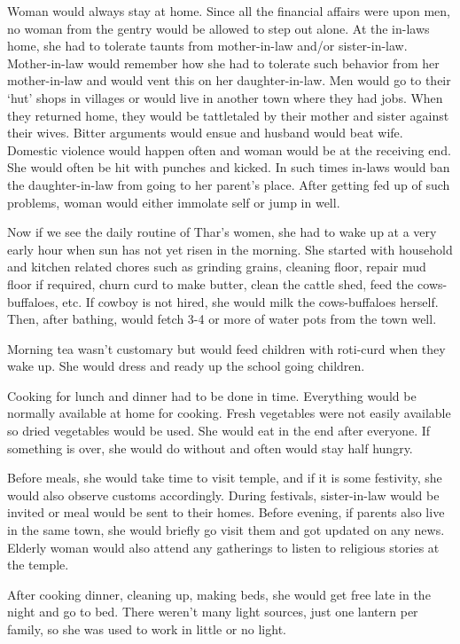 Woman would always stay at home. Since all the financial affairs were upon men,
no woman from the gentry would be allowed to step out alone. At the in-laws
home, she had to tolerate taunts from mother-in-law and/or sister-in-law.
Mother-in-law would remember how she had to tolerate such behavior from her
mother-in-law and would vent this on her daughter-in-law. Men would go to their
`hut' shops in villages or would live in another town where they had jobs. When
they returned home, they would be tattletaled by their mother and sister
against their wives. Bitter arguments would ensue and husband would beat wife.
Domestic violence would happen often and woman would be at the receiving end.
She would often be hit with punches and kicked. In such times in-laws would ban
the daughter-in-law from going to her parent's place. After getting fed up of
such problems, woman would either immolate self or jump in well.

Now if we see the daily routine of Thar's women, she had to wake up at a very
early hour when sun has not yet risen in the morning. She started with
household and kitchen related chores such as grinding grains, cleaning floor,
repair mud floor if required, churn curd to make butter, clean the cattle shed,
feed the cows-buffaloes, etc. If cowboy is not hired, she would milk the
cows-buffaloes herself. Then, after bathing, would fetch 3-4 or more of water
pots from the town well.

Morning tea wasn't customary but would feed children with roti-curd when they
wake up. She would dress and ready up the school going children. 

Cooking for lunch and dinner had to be done in time. Everything would be
normally available at home for cooking. Fresh vegetables were not easily
available so dried vegetables would be used. She would eat in the end after
everyone. If something is over, she would do without and often would stay half
hungry.

Before meals, she would take time to visit temple, and if it is some festivity,
she would also observe customs accordingly. During festivals, sister-in-law
would be invited or meal would be sent to their homes. Before evening, if
parents also live in the same town, she would briefly go visit them and got
updated on any news. Elderly woman would also attend any gatherings to listen
to religious stories at the temple.

After cooking dinner, cleaning up, making beds, she would get free late in the
night and go to bed. There weren't many light sources, just one lantern per
family, so she was used to work in little or no light.

